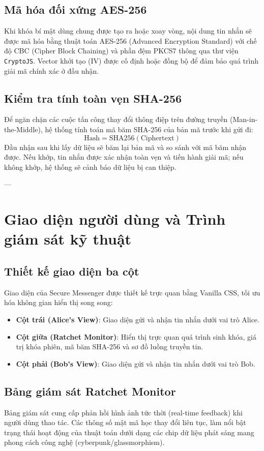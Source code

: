 \documentclass[12pt,a4paper]{article}
\begin{document}
\subsection{Mã hóa đối xứng AES-256}
Khi khóa bí mật dùng chung được tạo ra hoặc xoay vòng, nội dung tin nhắn sẽ được mã hóa bằng thuật toán AES-256 (Advanced Encryption Standard) với chế độ CBC (Cipher Block Chaining) và phần đệm PKCS7 thông qua thư viện \texttt{CryptoJS}. Vector khởi tạo (IV) được cố định hoặc đồng bộ để đảm bảo quá trình giải mã chính xác ở đầu nhận.

\subsection{Kiểm tra tính toàn vẹn SHA-256}
Để ngăn chặn các cuộc tấn công thay đổi thông điệp trên đường truyền (Man-in-the-Middle), hệ thống tính toán mã băm SHA-256 của bản mã trước khi gửi đi:
\begin{equation}
    \text{Hash} = \text{SHA256}(\text{Ciphertext})
\end{equation}
Đầu nhận sau khi lấy dữ liệu sẽ băm lại bản mã và so sánh với mã băm nhận được. Nếu khớp, tin nhắn được xác nhận toàn vẹn và tiến hành giải mã; nếu không khớp, hệ thống sẽ cảnh báo dữ liệu bị can thiệp.

---

\section{Giao diện người dùng và Trình giám sát kỹ thuật}
\subsection{Thiết kế giao diện ba cột}
Giao diện của Secure Messenger được thiết kế trực quan bằng Vanilla CSS, tối ưu hóa không gian hiển thị song song:
\begin{itemize}
    \item \textbf{Cột trái (Alice's View)}: Giao diện gửi và nhận tin nhắn dưới vai trò Alice.
    \item \textbf{Cột giữa (Ratchet Monitor)}: Hiển thị trực quan quá trình sinh khóa, giá trị khóa phiên, mã băm SHA-256 và sơ đồ luồng truyền tin.
    \item \textbf{Cột phải (Bob's View)}: Giao diện gửi và nhận tin nhắn dưới vai trò Bob.
\end{itemize}

\subsection{Bảng giám sát Ratchet Monitor}
Bảng giám sát cung cấp phản hồi hình ảnh tức thời (real-time feedback) khi người dùng thao tác. Các thông số mật mã học thay đổi liên tục, làm nổi bật trạng thái hoạt động của thuật toán dưới dạng các chip dữ liệu phát sáng mang phong cách công nghệ (cyberpunk/glassmorphism).
\end{document}

